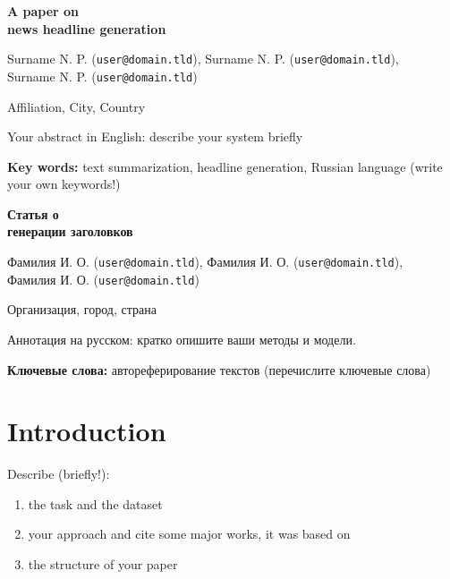 \documentclass{dialogue}
\begin{document}
\begin{otherlanguage}{english}
\begin{center}
{\Large\bfseries{A paper on\\news headline generation}}

\medskip

Surname N. P. (\texttt{user@domain.tld}), Surname N. P. (\texttt{user@domain.tld}),\\Surname N. P. (\texttt{user@domain.tld})

\medskip

Affiliation, City, Country
\end{center}

Your abstract in English: describe your system briefly\medskip

\textbf{Key words:} text summarization, headline generation, Russian language (write your own keywords!)
\end{otherlanguage}

\bigskip

\begin{otherlanguage}{russian}
\begin{center}
{\Large\bfseries{Статья о\\генерации заголовков}}

\medskip

Фамилия И. О. (\texttt{user@domain.tld}), Фамилия И. О. (\texttt{user@domain.tld}),\\Фамилия И. О. (\texttt{user@domain.tld})

\medskip

Организация, город, страна
\end{center}

Аннотация на русском: кратко опишите ваши методы и модели.\medskip

\textbf{Ключевые слова:} автореферирование текстов  (перечислите  ключевые слова)
\end{otherlanguage}


\section{Introduction}
Describe (briefly!):
\begin{enumerate}
    \item the task and the dataset
    \item your approach and cite some major works, it was based on 
    \item the structure of your paper
\end{enumerate}
\end{document}
